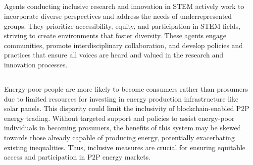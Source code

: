 \documentclass[UTF8,a4paper,AutoFakeBold,AutoFakeSlant]{article}
\begin{document}
\subsection{}

Agents conducting inclusive research and innovation in STEM actively work to incorporate diverse perspectives and address the needs of underrepresented groups. They prioritize accessibility, equity, and participation in STEM fields, striving to create environments that foster diversity. These agents engage communities, promote interdisciplinary collaboration, and develop policies and practices that ensure all voices are heard and valued in the research and innovation processes.


\subsection{}

Energy-poor people are more likely to become consumers rather than prosumers due to limited resources for investing in energy production infrastructure like solar panels. This disparity could limit the inclusivity of blockchain-enabled P2P energy trading. Without targeted support and policies to assist energy-poor individuals in becoming prosumers, the benefits of this system may be skewed towards those already capable of producing energy, potentially exacerbating existing inequalities. Thus, inclusive measures are crucial for ensuring equitable access and participation in P2P energy markets.


% 
% 
% 
\end{document}
